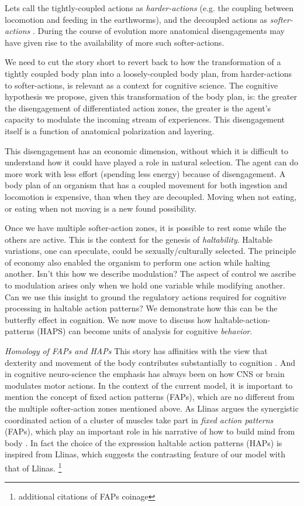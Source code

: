 Lets call the tightly-coupled actions as \textit{harder-actions} (e.g. the coupling between locomotion and feeding in the earthworms), and the decoupled actions as \textit{softer-actions} \cite{nagarjuna_muscularity_2005}. During the course of evolution more anatomical disengagements may have given rise to the availability of more such softer-actions.

We need to cut the story short to revert back to how the transformation of a tightly coupled body plan into a loosely-coupled body plan, from harder-actions to softer-actions, is relevant as a context for cognitive science. The cognitive hypothesis we propose, given this transformation of the body plan, is: the greater the disengagement of differentiated action zones, the greater is the agent's capacity to modulate the incoming stream of experiences. This disengagement itself is a function of anatomical polarization and layering.

This disengagement has an economic dimension, without which it is difficult to understand how it could have played a role in natural selection. The agent can do more work with less effort (spending less energy) because of disengagement. A body plan of an organism that has a coupled movement for both ingestion and locomotion is expensive, than when they are decoupled. Moving when not eating, or eating when not moving is a new found possibility.

Once we have multiple softer-action zones, it is possible to rest some while the others are active. This is the context for the genesis of \textit{haltability}. Haltable variations, one can speculate, could be sexually/culturally selected. The principle of economy also enabled the organism to perform one action while halting another. Isn't this how we describe modulation? The aspect of control we ascribe to modulation arises only when we hold one variable while modifying another. Can we use this insight to ground the regulatory actions required for cognitive processing in haltable action patterns?  We demonstrate how this can be the butterfly effect in cognition. We now move to discuss how haltable-action-patterns (HAPS) can become units of analysis for cognitive \textit{behavior}.

\emph{Homology of FAPs and HAPs} This story has affinities with the view that dexterity and movement of the body contributes substantially to cognition \cite{bernstein2014dexterity}. And in cognitive neuro-science the emphasis has always been on how CNS or brain modulates motor actions. In the context of the current model, it is important to mention the concept of fixed action patterns (FAPs), which are no different from the multiple softer-action zones mentioned above. As Llinas argues the synergistic coordinated action of a cluster of muscles take part in \textit{fixed action patterns} (FAPs), which play an important role in his narrative of how to build mind from body \cite{llinas2002vortex}. In fact the choice of the expression haltable action patterns (HAPs) is inspired from Llinas, which suggests the contrasting feature of our model with that of Llinas. \footnote{ additional citations of FAPs coinage}

